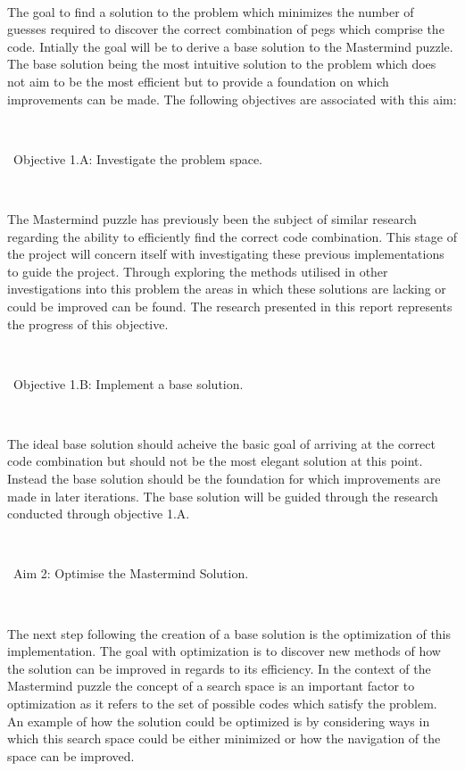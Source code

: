 \documentclass[12pt]{article}  %
\theoremstyle{definition}
\theoremstyle{remark}
\begin{document}
\

 The goal to find a solution to the problem which minimizes the number of guesses required to discover the correct combination of pegs which comprise the code. Intially the goal will be to derive a base solution to the Mastermind puzzle. The base solution being the most intuitive solution to the problem which does not aim to be the most efficient but to provide a foundation on which improvements can be made. The following objectives are associated with this aim:

\

\textbullet\ Objective 1.A: Investigate the problem space.

\

The Mastermind puzzle has previously been the subject of similar research regarding the ability to efficiently find the correct code combination. This stage of the project will concern itself with investigating these previous implementations to guide the project. Through exploring the methods utilised in other investigations into this problem the areas in which these solutions are lacking or could be improved can be found. The research presented in this report represents the progress of this objective.

\

\textbullet\ Objective 1.B:  Implement a base solution.

\

The ideal base solution should acheive the basic goal of arriving at the correct code combination but should not be the most elegant solution at this point. Instead the base solution should be the foundation for which improvements are made in later iterations. The base solution will be guided through the research conducted through objective 1.A.

\

\textbullet\ Aim 2: Optimise the Mastermind Solution.

\

The next step following the creation of a base solution is the optimization of this implementation. The goal with optimization is to discover new methods of how the solution can be improved in regards to its efficiency. In the context of the Mastermind puzzle the concept of a search space is an important factor to optimization as it refers to the set of possible codes which satisfy the problem. An example of how the solution could be optimized is by considering ways in which this search space could be either minimized or how the navigation of the space can be improved.
\end{document}
